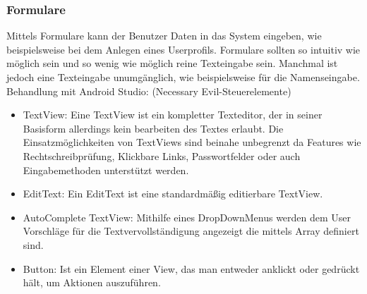 \documentclass[FIPLY_base.tex]{subfiles}
\begin{document}
\subsubsection{Formulare}
Mittels Formulare kann der Benutzer Daten in das System eingeben, wie beispielsweise bei dem Anlegen eines Userprofils. Formulare sollten so intuitiv wie möglich sein und so wenig wie möglich reine Texteingabe sein. Manchmal ist jedoch eine Texteingabe unumgänglich, wie beispielsweise für die Namenseingabe.
Behandlung mit Android Studio: (Necessary Evil-Steuerelemente)

\begin{itemize}
	\item TextView: Eine TextView ist ein kompletter Texteditor, der in seiner Basisform allerdings kein bearbeiten des Textes erlaubt. Die Einsatzmöglichkeiten von TextViews sind beinahe unbegrenzt da Features wie Rechtschreibprüfung, Klickbare Links, Passwortfelder oder auch Eingabemethoden unterstützt werden.
	\item EditText: Ein EditText ist eine standardmäßig editierbare TextView.
	\item AutoComplete TextView: Mithilfe eines DropDownMenus werden dem User Vorschläge für die Textvervollständigung angezeigt die mittels Array definiert sind.
	\item Button: Ist ein Element einer View, das man entweder anklickt oder gedrückt hält, um Aktionen auszuführen.
\end{itemize}
\end{document}
